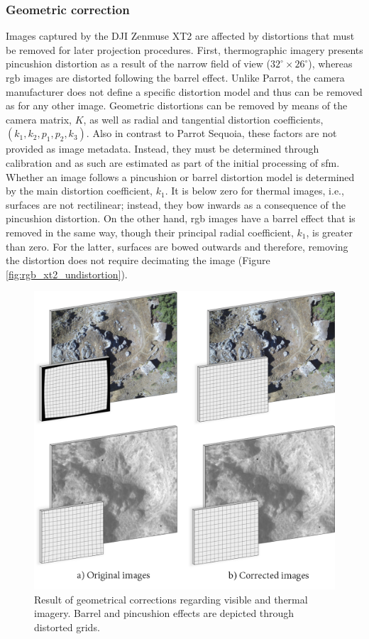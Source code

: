 \subsubsection{Geometric correction}

Images captured by the DJI Zenmuse XT2 are affected by distortions that must be removed for later projection procedures. First, thermographic imagery presents pincushion distortion as a result of the narrow field of view ($32^\circ \times 26^\circ$), whereas \acrshort{rgb} images are distorted following the barrel effect. Unlike Parrot, the camera manufacturer does not define a specific distortion model and thus can be removed as for any other image. Geometric distortions can be removed by means of the camera matrix, $K$, as well as radial and tangential distortion coefficients, $(k_1, k_2, p_1, p_2, k_3)$. Also in contrast to Parrot Sequoia, these factors are not provided as image metadata. Instead, they must be determined through calibration and as such are estimated as part of the initial processing of \acrshort{sfm}. Whether an image follows a pincushion or barrel distortion model is determined by the main distortion coefficient, $k_1$. It is below zero for thermal images, i.e., surfaces are not rectilinear; instead, they bow inwards as a consequence of the pincushion distortion. On the other hand, \acrshort{rgb} images have a barrel effect that is removed in the same way, though their principal radial coefficient, $k_1$, is greater than zero. For the latter, surfaces are bowed outwards and therefore, removing the distortion does not require decimating the image (Figure \ref{fig:rgb_xt2_undistortion}).

\begin{figure}
    \includegraphics{figs/materials/thermal_distortion.png}
    \caption{Result of geometrical corrections regarding visible and thermal imagery. Barrel and pincushion effects are depicted through distorted grids.}
    \label{fig:thermal_rgb_distortion}
\end{figure}

